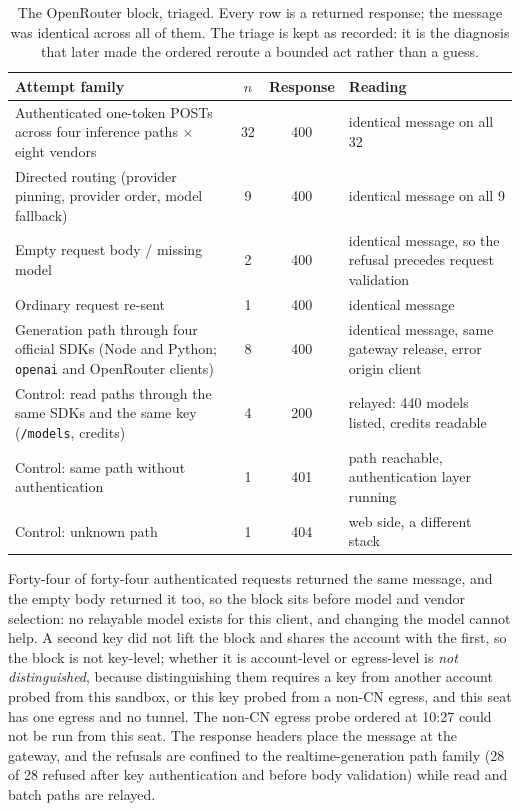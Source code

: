 \documentclass[11pt,a4paper]{article}
\begin{document}
\begin{table}[t]
\centering
\caption{The OpenRouter block, triaged. Every row is a returned response; the message was identical across all of them. The triage is kept as recorded: it is the diagnosis that later made the ordered reroute a bounded act rather than a guess.}
\label{tab:blocked}
\begin{tabular}{lccp{7.2cm}}
\toprule
Attempt family & $n$ & Response & Reading \\
\midrule
Authenticated one-token POSTs across four inference paths $\times$ eight vendors & 32 & 400 & identical message on all 32 \\
Directed routing (provider pinning, provider order, model fallback) & 9 & 400 & identical message on all 9 \\
Empty request body / missing model & 2 & 400 & identical message, so the refusal precedes request validation \\
Ordinary request re-sent & 1 & 400 & identical message \\
Generation path through four official SDKs (Node and Python; \texttt{openai} and OpenRouter clients) & 8 & 400 & identical message, same gateway release, error origin client \\
Control: read paths through the same SDKs and the same key (\texttt{/models}, credits) & 4 & 200 & relayed: 440 models listed, credits readable \\
Control: same path without authentication & 1 & 401 & path reachable, authentication layer running \\
Control: unknown path & 1 & 404 & web side, a different stack \\
\bottomrule
\end{tabular}
\end{table}

Forty-four of forty-four authenticated requests returned the same message, and the empty body returned it too, so the block sits before model and vendor selection: no relayable model exists for this client, and changing the model cannot help. A second key did not lift the block and shares the account with the first, so the block is not key-level; whether it is account-level or egress-level is \emph{not distinguished}, because distinguishing them requires a key from another account probed from this sandbox, or this key probed from a non-CN egress, and this seat has one egress and no tunnel. The non-CN egress probe ordered at 10:27 could not be run from this seat. The response headers place the message at the gateway, and the refusals are confined to the realtime-generation path family (28 of 28 refused after key authentication and before body validation) while read and batch paths are relayed.
\end{document}
